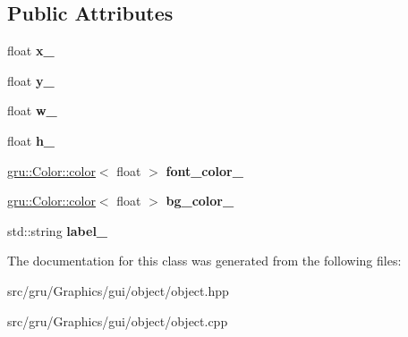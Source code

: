 \subsection*{\-Public \-Attributes}
\begin{DoxyCompactItemize}
\item 
\hypertarget{classglutpp_1_1gui_1_1object_1_1Data_acf081bf8c7c69daad87e0de47056308e}{float {\bfseries x\-\_\-}}\label{classglutpp_1_1gui_1_1object_1_1Data_acf081bf8c7c69daad87e0de47056308e}

\item 
\hypertarget{classglutpp_1_1gui_1_1object_1_1Data_a46f370f14bcccf23b8f7e12ff2e73357}{float {\bfseries y\-\_\-}}\label{classglutpp_1_1gui_1_1object_1_1Data_a46f370f14bcccf23b8f7e12ff2e73357}

\item 
\hypertarget{classglutpp_1_1gui_1_1object_1_1Data_a3765c0e10617124dd8ce4c7b5deaa88c}{float {\bfseries w\-\_\-}}\label{classglutpp_1_1gui_1_1object_1_1Data_a3765c0e10617124dd8ce4c7b5deaa88c}

\item 
\hypertarget{classglutpp_1_1gui_1_1object_1_1Data_ae501c8022a36f381fdb760a2f6820fee}{float {\bfseries h\-\_\-}}\label{classglutpp_1_1gui_1_1object_1_1Data_ae501c8022a36f381fdb760a2f6820fee}

\item 
\hypertarget{classglutpp_1_1gui_1_1object_1_1Data_a6b76083157956df4feb7ab6186298d98}{\hyperlink{classgru_1_1Color_1_1color}{gru\-::\-Color\-::color}$<$ float $>$ {\bfseries font\-\_\-color\-\_\-}}\label{classglutpp_1_1gui_1_1object_1_1Data_a6b76083157956df4feb7ab6186298d98}

\item 
\hypertarget{classglutpp_1_1gui_1_1object_1_1Data_adb8883f6670c143de80855a878c92528}{\hyperlink{classgru_1_1Color_1_1color}{gru\-::\-Color\-::color}$<$ float $>$ {\bfseries bg\-\_\-color\-\_\-}}\label{classglutpp_1_1gui_1_1object_1_1Data_adb8883f6670c143de80855a878c92528}

\item 
\hypertarget{classglutpp_1_1gui_1_1object_1_1Data_a03caa7b773f169bed4d743730c236e5e}{std\-::string {\bfseries label\-\_\-}}\label{classglutpp_1_1gui_1_1object_1_1Data_a03caa7b773f169bed4d743730c236e5e}

\end{DoxyCompactItemize}


\-The documentation for this class was generated from the following files\-:\begin{DoxyCompactItemize}
\item 
src/gru/\-Graphics/gui/object/object.\-hpp\item 
src/gru/\-Graphics/gui/object/object.\-cpp\end{DoxyCompactItemize}
